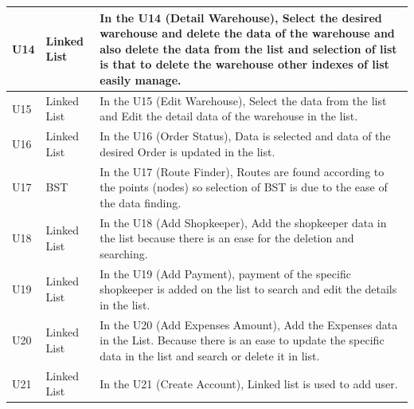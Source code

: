 \documentclass[12pt,a4paper]{report}
\begin{document}
\begin{tabular}{ | m{2cm} | m{3cm}|m{9cm}| } \hline
U14 &Linked List& In the U14 (Detail Warehouse), Select the desired warehouse and delete the data of the warehouse and also delete the data from the list and selection of list is that to delete the warehouse other indexes of list easily manage.
 
\\ \hline
U15 &Linked List&In the U15 (Edit Warehouse), Select the data from the list and Edit the detail data of the warehouse in the list. 
 
 \\ \hline
U16 &Linked List& In the U16 (Order Status), Data is selected and data of the desired Order is updated in the list.\\ \hline
U17 &BST        & In the U17 (Route Finder), Routes are found according to the points (nodes) so selection of BST is due to the ease of the data finding.\\ \hline
U18 &Linked List&In the U18 (Add Shopkeeper), Add the shopkeeper data in the list because there is an ease for the deletion and searching. \\ \hline
U19 &Linked List& In the U19 (Add Payment), payment of the specific shopkeeper is added on the list to search and edit the details in the list.\\ \hline
U20 &Linked List&In the U20 (Add Expenses Amount), Add the Expenses data in the List. Because there is an ease to update the specific data in the list and search or delete it in list. \\ \hline
U21 &Linked List&In the U21 (Create Account), Linked list is used to add user. \\ \hline

\end{tabular}
\end{document}
